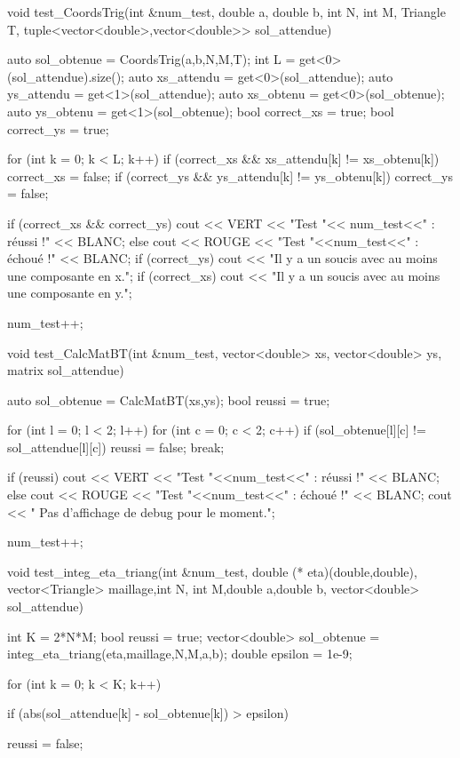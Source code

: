 \begin{codeblock}
{}


void test_CoordsTrig(int &num_test, double a, double b, int N, int M, Triangle T,
    tuple<vector<double>,vector<double>> sol_attendue){

    auto sol_obtenue = CoordsTrig(a,b,N,M,T);
    int L = get<0>(sol_attendue).size();
    auto xs_attendu = get<0>(sol_attendue);
    auto ys_attendu = get<1>(sol_attendue);
    auto xs_obtenu = get<0>(sol_obtenue);
    auto ys_obtenu = get<1>(sol_obtenue);
    bool correct_xs = true;
    bool correct_ys = true;

    for (int k = 0; k < L; k++){
        if (correct_xs && xs_attendu[k] != xs_obtenu[k]) correct_xs = false;
        if (correct_ys && ys_attendu[k] != ys_obtenu[k]) correct_ys = false;
    }

    if (correct_xs && correct_ys){
        cout << VERT << "Test "<< num_test<<" : réussi !\n" << BLANC;
    } else {
        cout << ROUGE << "Test "<<num_test<<" : échoué !\n" << BLANC;
        if (correct_ys){
            cout << "Il y a un soucis avec au moins une composante en x.\n";
        }
        if (correct_xs){
            cout << "Il y a un soucis avec au moins une composante en y.\n";
        }
    }

    num_test++;
}


void test_CalcMatBT(int &num_test, vector<double> xs, vector<double> ys,
    matrix sol_attendue){

    auto sol_obtenue = CalcMatBT(xs,ys);
    bool reussi = true;

    for (int l = 0; l < 2; l++){
        for (int c = 0; c < 2; c++){
            if (sol_obtenue[l][c] != sol_attendue[l][c]){
                reussi = false;
                break;
            }
        }
    }

    if (reussi){
        cout << VERT << "Test "<<num_test<<" : réussi !\n" << BLANC;
    } else {
        cout << ROUGE << "Test "<<num_test<<" : échoué !\n" << BLANC;
        cout << "   Pas d'affichage de debug pour le moment.\n";
    }

    num_test++;
}


void test_integ_eta_triang(int &num_test, double (* eta)(double,double),
    vector<Triangle> maillage,int N, int M,double a,double b,
    vector<double> sol_attendue){

    int K = 2*N*M;
    bool reussi = true;
    vector<double> sol_obtenue = integ_eta_triang(eta,maillage,N,M,a,b);
    double epsilon = 1e-9;

    for (int k = 0; k < K; k++){
        if (abs(sol_attendue[k] - sol_obtenue[k]) > epsilon){
            reussi = false;

}}}
\end{codeblock}
